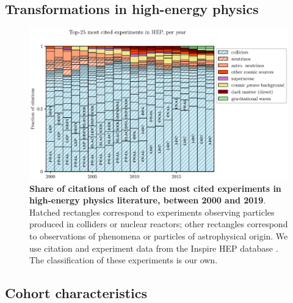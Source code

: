 \documentclass{article}
\begin{document}
\subsection{\label{appendix:landscape}Transformations in high-energy physics}

\begin{figure}[H]
    \centering
    \includegraphics[width=\textwidth]{Fig10}
    \caption{\textbf{Share of citations of each of the most cited experiments in high-energy physics literature, between 2000 and 2019}. Hatched rectangles correspond to experiments observing particles produced in colliders or nuclear reactors; other rectangles correspond to observations of phenomena or particles of astrophysical origin. We use citation and experiment data from the Inspire HEP database \citep{InspireAPI}. The classification of these experiments is our own. }
    \label{fig:experiments}
\end{figure}


\subsection{\label{appendix:sample_characteristics}Cohort characteristics}
\end{document}
